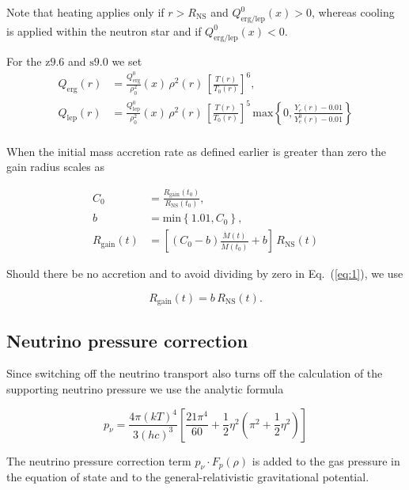 \documentclass[fleqn,usenatbib]{mnras}
\newcommand{\snine}{\ensuremath{\mathrm{s9.0}}\xspace}
\newcommand{\znine}{\ensuremath{\mathrm{z9.6}}\xspace}
\begin{document}
Note that heating applies only if $r > R_\mathrm{NS}$ and $Q_\mathrm{erg/lep}^0 (x) > 0$, whereas cooling is applied within the neutron star and if $Q_\mathrm{erg/lep}^0 (x) < 0$.

For the \znine and \snine we set
\begin{align}
    Q_\mathrm{erg}(r) &= \frac{Q_\mathrm{erg}^0}{\rho_0^2}(x) \,\rho^2 (r)
    \,\left[\frac{T(r)}{T_0(r)}\right]^6 ,\\
    Q_\mathrm{lep}(r) &= \frac{Q_\mathrm{lep}^0}{\rho_0^2}(x) \,\rho^2 (r)
    \,\left[\frac{T(r)}{T_0(r)}\right]^5 \, \mathrm{max}\left\{0, \frac{Y_e(r) -
    0.01}{Y_e^0(r) - 0.01}\right\} \\
\end{align}


When the initial mass accretion rate as defined earlier is greater than zero the gain radius scales as

\begin{align}
    C_0 &= \frac{R_\mathrm{gain}(t_0)}{R_\mathrm{NS}(t_0)}, \\
    b &= \mathrm{min} \left\{1.01, C_0 \right\}, \\
    R_\mathrm{gain}(t) &= \left[ \left( C_0 - b \right)
    \frac{\dot{M}(t)}{\dot{M}(t_0)} + b \right] \,R_\mathrm{NS}(t)
    \label{eq:1}
\end{align}

Should there be no accretion and to avoid dividing by zero in Eq.~(\ref{eq:1}),  we use

\begin{equation}
    R_\mathrm{gain}(t) = b \, R_\mathrm{NS}(t).
\end{equation}

\subsection{Neutrino pressure correction}

Since switching off the neutrino transport also turns off the calculation of the supporting neutrino pressure we use the analytic formula

\begin{equation}
    p_{\nu} = \frac{4 \pi (k T)^4}{3 (h c)^3} \left[ \frac{21
    \pi^4}{60} + \frac{1}{2} \eta^2 \left( \pi^2 + \frac{1}{2} \eta^2 \right)
    \right]
\end{equation}

The neutrino pressure correction  term $p_{\nu} \cdot F_p(\rho)$ is added to the gas pressure in the equation of state and to the general-relativistic gravitational potential.
\end{document}
